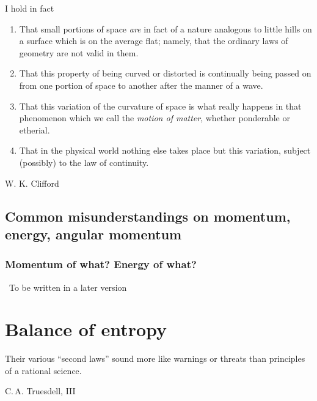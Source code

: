 \documentclass[a4paper,12pt,%
onecolumn,oneside,%
british%
]{memoir}
\newcommand{\mynotew}[1]{{\footnotesize\color{midgrey}\faIcon{tools}\ #1}}
\renewcommand*{\|}[1][]{\nonscript\:#1\vert\nonscript\:\mathopen{}}
\begin{document}
\epigraph{%
I hold in fact
 \begin{enumerate}[label=(\arabic*),wide,nosep,itemindent=2em]
 \item That small portions of space \emph{are} in fact of a nature analogous to little hills on a surface which is on the average flat; namely, that the ordinary laws of geometry are not valid in them.
 \item That this property of being curved or distorted is continually being passed on from one portion of space to another after the manner of a wave.
 \item That this variation of the curvature of space is what really happens in that phenomenon which we call the \emph{motion of matter}, whether ponderable or etherial.
 \item That in the physical world nothing else takes place but this variation, subject (possibly) to the law of continuity.
 \end{enumerate}
}{W. K. Clifford \cites*{clifford1876}}

\section{Common misunderstandings on momentum, energy, angular momentum}
\label{sec:pitfalls_energy_momentum}

\subsection{Momentum of what? Energy of what?}
\label{sec:momentum_of_what}




\mynotew{To be written in a later version}


\printpagenotes*
\cleartooddpage
\chapter{Balance of entropy}
\label{cha:bal_entropy}


\epigraph{Their various ``second laws'' sound more like warnings or threats than principles of a rational science.}{C.\,A. Truesdell, III \cites*{truesdell1969_r1984}}
\end{document}
